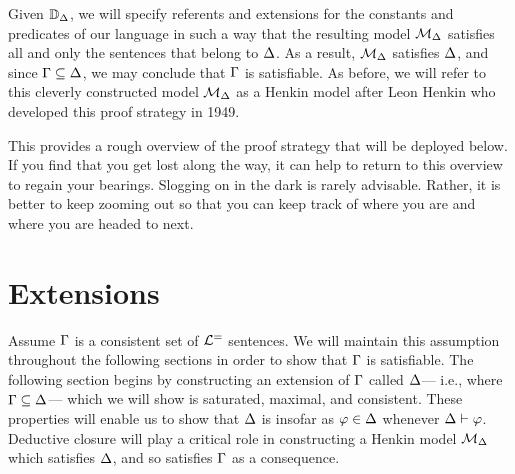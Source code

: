 Given $\mathbb{D}_{\Delta}$, we will specify referents and extensions for the constants and predicates of our language in such a way that the resulting model $\mathcal{M}_{\Delta}$ satisfies all and only the sentences that belong to $\Delta$.
As a result, $\mathcal{M}_{\Delta}$ satisfies $\Delta$, and since $\Gamma\subseteq\Delta$, we may conclude that $\Gamma$ is satisfiable. 
As before, we will refer to this cleverly constructed model $\mathcal{M}_{\Delta}$ as a Henkin model after Leon Henkin who developed this proof strategy in 1949.

This provides a rough overview of the proof strategy that will be deployed below.
If you find that you get lost along the way, it can help to return to this overview to regain your bearings.
Slogging on in the dark is rarely advisable.
Rather, it is better to keep zooming out so that you can keep track of where you are and where you are headed to next.







\section{Extensions}%
  \label{sec:Extensions}

Assume $\Gamma$ is a consistent set of $\mathcal{L}^{=}$ sentences.
We will maintain this assumption throughout the following sections in order to show that $\Gamma$ is satisfiable. 
The following section begins by constructing an extension of $\Gamma$ called $\Delta$--- i.e., where $\Gamma \subseteq \Delta$---  which we will show is saturated, maximal, and consistent.
These properties will enable us to show that $\Delta$ is  insofar as $\varphi\in\Delta$ whenever $\Delta\vdash\varphi$. 
Deductive closure will play a critical role in constructing a Henkin model $\mathcal{M}_{\Delta}$ which satisfies $\Delta$, and so satisfies $\Gamma$ as a consequence. 





